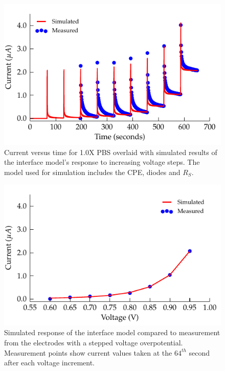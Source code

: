 \documentclass[journal, a4paper]{IEEEtran}
\begin{document}
\begin{figure}
    \begin{center}
        \includegraphics{graphics/faradaic_currentVsTimeIEEE}
    \end{center}
    \caption{Current versus time for 1.0X PBS overlaid with simulated results of the interface model's response to increasing voltage steps. The model used for simulation includes the CPE, diodes and $R_{S}$.}
    \label{fig:faradaic_currentVsTime}
\end{figure}

\begin{figure}
    \begin{center}
        \includegraphics{graphics/faradaic_currentVsVoltageIEEE}
    \end{center}
    \caption{Simulated response of the interface model compared to measurement from the electrodes with a stepped voltage overpotential. Measurement points show current values taken at the $64^{th}$ second after each voltage increment.}
    \label{fig:faradaic_currentVsVoltage}
\end{figure}
\end{document}
